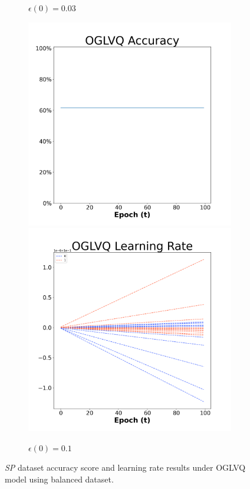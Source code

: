 \begin{figure}[H]
\begin{subfigure}{0.3\textwidth}
\caption{$\epsilon(0)=0.03$}
\end{subfigure}\hfil %
\begin{subfigure}{0.3\textwidth}
\includegraphics[width=\linewidth]{images/exper1/SP/OGLVQ_0.1_acc.png}
\includegraphics[width=\linewidth]{images/exper1/SP/OGLVQ_0.1_lr.png}
\caption{$\epsilon(0)=0.1$}
\end{subfigure}

\caption{\textit{SP} dataset accuracy score and learning rate results under OGLVQ model using balanced dataset.}
\end{figure}


